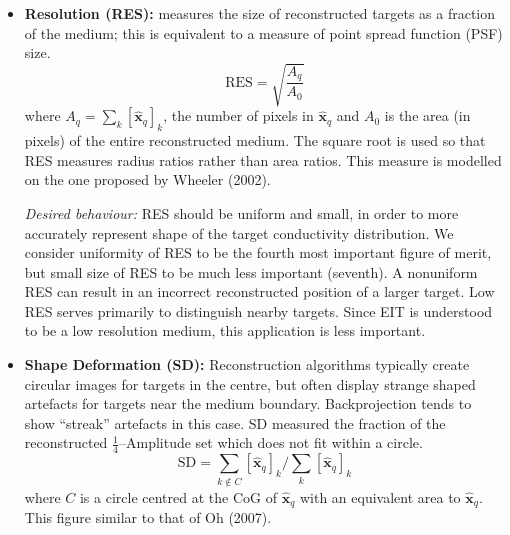 \documentclass[12pt]{iopart}
\newcommand{\xH}{\mbox{$\mathbf{\hat x}$}}
\begin{document}
\begin{itemize}
\hspace{5mm}
{\em Desired behaviour:}
PE should be small and show small variability for
targets at different radial positions. We consider
small and constant PE to be the second most important
figure of merit. If PE is variable, interpretation
of a distribution of air in the lungs becomes unreliable.
Sheffield backprojection has large PE near the
electrodes; this has resulted in cases where changes at
the electrodes are misinterpreted as being inside the body.

\item
{\bf Resolution (RES):}
measures the size of reconstructed targets as a fraction
of the medium; this is
equivalent to a measure of point spread function (PSF) size.
\begin{equation}
\mathrm{RES} = \sqrt{
 \frac{ A_q }
      { A_0 }
 }
\end{equation}
where $A_q =  \sum_k [\xH_q]_k$, the number
of pixels in $\xH_q$ and 
$A_0$ is the area (in pixels) of
the entire reconstructed medium. The square root is used 
so that RES measures radius ratios rather than area ratios.
This measure is modelled on the one proposed by
Wheeler \etal (2002).

\hspace{5mm}
{\em Desired behaviour:}
RES should be uniform and small, in order to 
more accurately represent shape of the target conductivity
distribution. We consider uniformity of RES to be the
fourth most important figure of merit, but small size
of RES to be much less important (seventh). A nonuniform
RES can result in an incorrect reconstructed 
position of a larger target. Low RES serves primarily
to distinguish nearby targets. Since EIT is understood to
be a low resolution medium, this application is less important.

\item
{\bf Shape Deformation (SD):}
Reconstruction algorithms typically create circular
images for targets in the centre, but often display 
strange shaped artefacts for targets near the medium
boundary. Backprojection tends to show ``streak''
artefacts in this case.
SD measured the fraction of the reconstructed
$\frac{1}{4}$--Amplitude set which does not
fit within a circle.
\begin{equation}
\mathrm{SD} = \sum_{k\not\in C} [\xH_q]_k / 
              \sum_{k} [\xH_q]_k
\end{equation}
where $C$ is a circle centred at the CoG of $\xH_q$
with an equivalent area to $\xH_q$. This figure
similar to that of Oh \etal (2007).


\end{itemize}
\end{document}
